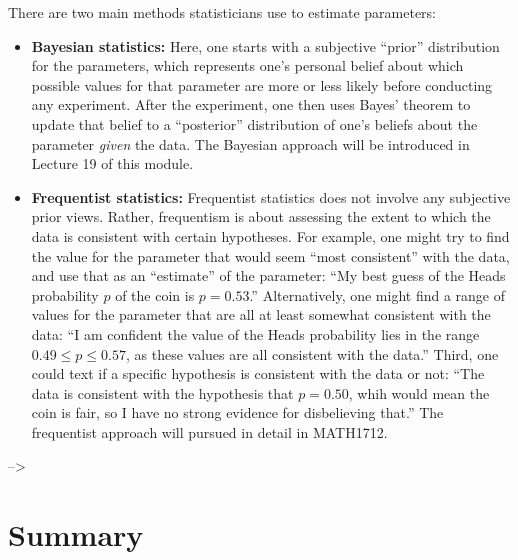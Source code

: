\documentclass[
  a4paper,
]{book}
\providecommand{\tightlist}{%
  \setlength{\itemsep}{0pt}\setlength{\parskip}{0pt}}
\theoremstyle{definition}
\theoremstyle{definition}
\theoremstyle{definition}
\theoremstyle{definition}
\theoremstyle{remark}
\begin{document}
There are two main methods statisticians use to estimate parameters:

\begin{itemize}
\tightlist
\item
  \textbf{Bayesian statistics:} Here, one starts with a subjective ``prior'' distribution for the parameters, which represents one's personal belief about which possible values for that parameter are more or less likely before conducting any experiment. After the experiment, one then uses Bayes' theorem to update that belief to a ``posterior'' distribution of one's beliefs about the parameter \emph{given} the data. The Bayesian approach will be introduced in Lecture 19 of this module.
\item
  \textbf{Frequentist statistics:} Frequentist statistics does not involve any subjective prior views. Rather, frequentism is about assessing the extent to which the data is consistent with certain hypotheses. For example, one might try to find the value for the parameter that would seem ``most consistent'' with the data, and use that as an ``estimate'' of the parameter: ``My best guess of the Heads probability \(p\) of the coin is \(p = 0.53\).'' Alternatively, one might find a range of values for the parameter that are all at least somewhat consistent with the data: ``I am confident the value of the Heads probability lies in the range \(0.49 \leq p \leq 0.57\), as these values are all consistent with the data.'' Third, one could text if a specific hypothesis is consistent with the data or not: ``The data is consistent with the hypothesis that \(p = 0.50\), whih would mean the coin is fair, so I have no strong evidence for disbelieving that.'' The frequentist approach will pursued in detail in MATH1712.
\end{itemize}

--\textgreater{}

\hypertarget{summary-06}{%
\section*{Summary}\label{summary-06}}
\end{document}
